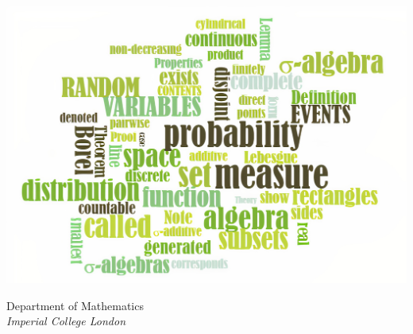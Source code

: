 \begin{titlepage}
{\sffamily
\maketitle
\begin{center}
    \vfill
    \includegraphics[scale = 1.7]{mypic.jpg}
    
    \vspace{4cm}
    \Large
    Department of Mathematics\\
    \textit{Imperial College London}\\
\end{center}}
\end{titlepage}
\newpage